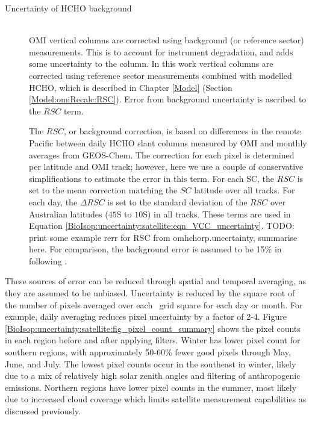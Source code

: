 \begin{description}
        
        
      \item [Uncertainty of HCHO background] \hfill \\
        OMI vertical columns are corrected using background (or reference sector) measurements.
        This is to account for instrument degradation, and adds some uncertainty to the column.
        In this work vertical columns are corrected using reference sector measurements combined with modelled HCHO, which is described in Chapter \ref{Model} (Section \ref{Model:omiRecalc:RSC}).
        Error from background uncertainty is ascribed to the $RSC$ term.
        
        The $RSC$, or background correction, is based on differences in the remote Pacific between daily HCHO slant columns measured by OMI and monthly averages from GEOS-Chem.
        The correction for each pixel is determined per latitude and OMI track; however, here we use a couple of conservative simplifications to estimate the error in this term.
        For each SC, the $RSC$ is set to the mean correction matching the $SC$ latitude over all tracks.
        For each day, the $\Delta RSC$ is set to the standard deviation of the $RSC$ over Australian latitudes ($45$\degr S to $10$\degr S) in all tracks.
        These terms are used in Equation \ref{BioIsop:uncertainty:satellite:eqn_VCC_uncertainty}.
        TODO: print some example rerr for RSC from omhchorp.uncertainty, summarise here.
        For comparison, the background error is assumed to be 15\% in \textcite{Curci2010} following \parencite{Dufour2009}.
        
    \end{description}
    These sources of error can be reduced through spatial and temporal averaging, as they are assumed to be unbiased.
    Uncertainty is reduced by the square root of the number of pixels averaged over each \lowhr ~grid square for each day or month.
    For example, daily averaging reduces pixel uncertainty by a factor of 2-4.
    Figure \ref{BioIsop:uncertainty:satellite:fig_pixel_count_summary} shows the pixel counts in each region before and after applying filters.
    Winter has lower pixel count for southern regions, with approximately 50-60\% fewer good pixels through May, June, and July.
    The lowest pixel counts occur in the southeast in winter, likely due to a mix of relatively high solar zenith angles and filtering of anthropogenic emissions.
    Northern regions have lower pixel counts in the summer, most likely due to increased cloud coverage which limits satellite measurement capabilities as discussed previously.
    
